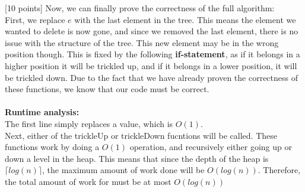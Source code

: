 \documentclass[12pt]{article}
\newcounter{ques}
\newenvironment{question}{\stepcounter{ques}{\noindent\bf Question \arabic{ques}:}}{\vspace{5mm}}
\begin{document}
\begin{question}[10 points]
Now, we can finally prove the correctness of the full algorithm:\\
First, we replace $e$ with the last element in the tree. This means the element we wanted to delete is now gone, and since we removed the last element, there is no issue with the structure of the tree. This new element may be in the wrong position though. This is fixed by the following \textbf{if-statement}, as if it belongs in a higher position it will be trickled up, and if it belongs in a lower position, it will be trickled down. Due to the fact that we have already proven the correctness of these functions, we know that our code must be correct.\\\\
\textbf{Runtime analysis:}\\
The first line simply replaces a value, which is $O(1)$.\\
Next, either of the trickleUp or trickleDown fucntions will be called. These functions work by doing a $O(1)$ operation, and recursively either going up or down a level in the heap. This means that since the depth of the heap is $\lceil log(n)\rceil$, the maximum amount of work done will be $O(log(n))$. Therefore, the total amount of work for  must be at most $O(log(n))$
\end{question}



\end{document}
